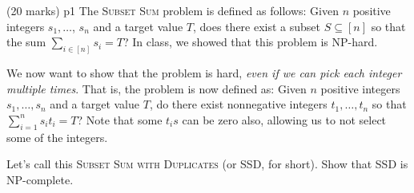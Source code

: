 \documentclass[a4paper, 11pt]{article}
\begin{document}
\addtocounter{problem}{4}
\begin{problem}{%
		\hfill  (20 marks)
	}{p1%
}
The \textsc{Subset Sum} problem is defined as follows: Given $n$ positive integers $s_1, \ldots$, $s_n$ and a target value $T$, does there exist a subset $S \subseteq[n]$ so that the sum $\sum\limits_{i \in[n]} s_i=T$? In class, we showed that this problem is NP-hard.\setlength{\parskip}{5mm}

We now want to show that the problem is hard, \textit{even if we can pick each integer multiple times}. That is, the problem is now defined as: Given $n$ positive integers $s_1, \ldots, s_n$ and a target value $T$, do there exist nonnegative integers $t_1, \ldots, t_n$ so that $\sum\limits_{i=1}^n s_i t_i=T$? Note that some $t_is$ can be zero also, allowing us to not select some of the integers.

Let's call this \textsc{Subset Sum with Duplicates} (or SSD, for short). Show that SSD is NP-complete.
\end{problem}
\end{document}
